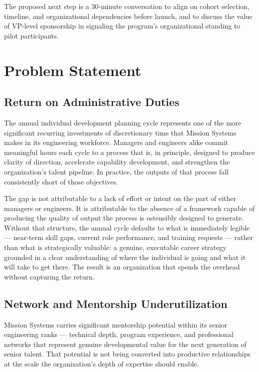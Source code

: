 \documentclass{article}
\begin{document}
The proposed next step is a 30-minute conversation to align on cohort selection, timeline, and organizational dependencies before launch, and to 
discuss the value of VP-level sponsorship in signaling the program's organizational standing to pilot participants.

\section{Problem Statement}

\subsection{Return on Administrative Duties}
The annual individual development planning cycle represents one of the more significant recurring investments of discretionary time that 
Mission Systems makes in its engineering workforce. Managers and engineers alike commit meaningful hours each cycle to a process that is, 
in principle, designed to produce clarity of direction, accelerate capability development, and strengthen the organization's talent pipeline. 
In practice, the outputs of that process fall consistently short of those objectives.

The gap is not attributable to a lack of effort or intent on the part of either managers or engineers. It is attributable to the absence of 
a framework capable of producing the quality of output the process is ostensibly designed to generate. Without that structure, the annual 
cycle defaults to what is immediately legible — near-term skill gaps, current role performance, and training requests — rather than what is 
strategically valuable: a genuine, executable career strategy grounded in a clear understanding of where the individual is going and what it 
will take to get there. The result is an organization that spends the overhead without capturing the return.

\subsection{Network and Mentorship Underutilization}

Mission Systems carries significant mentorship potential within its senior engineering ranks — technical depth, program experience, and 
professional networks that represent genuine developmental value for the next generation of senior talent. That potential is not being 
converted into productive relationships at the scale the organization's depth of expertise should enable.
\end{document}
